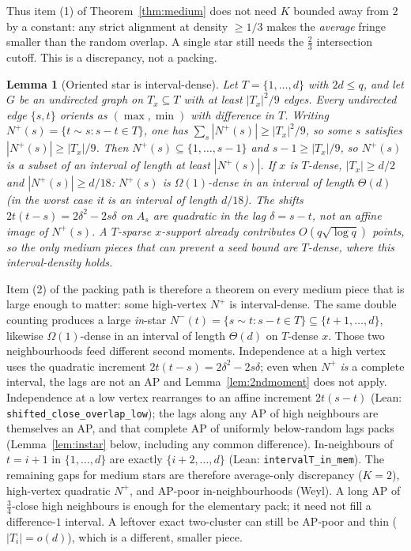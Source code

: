 \documentclass[11pt]{article}
\newtheorem{lemma}[theorem]{Lemma}
\theoremstyle{definition}
\begin{document}
Thus item (1) of Theorem~\ref{thm:medium} does not need $K$ bounded
away from $2$ by a constant: any strict alignment at density $\ge 1/3$
makes the \emph{average} fringe smaller than the random overlap.
A single star still needs the $\tfrac23$ intersection cutoff.
This is a discrepancy, not a packing.

\begin{lemma}[Oriented star is interval-dense]\label{lem:stardense}
Let $T=\{1,\dots,d\}$ with $2d\le q$, and let $G$ be an undirected graph
on $T_x\subseteq T$ with at least $|T_x|^{2}/9$ edges.
Every undirected edge $\{s,t\}$ orients as $(\max,\min)$ with
difference in $T$.
Writing $N^+(s)=\{t\sim s:s-t\in T\}$, one has
$\sum_s|N^+(s)|\ge|T_x|^{2}/9$, so some $s$ satisfies
$|N^+(s)|\ge|T_x|/9$.
Then $N^+(s)\subseteq\{1,\dots,s-1\}$ and $s-1\ge|T_x|/9$, so $N^+(s)$
is a subset of an interval of length at least $|N^+(s)|$.
If $x$ is $T$-dense, $|T_x|\ge d/2$ and $|N^+(s)|\ge d/18$:
$N^+(s)$ is $\Omega(1)$-dense in an interval of length $\Theta(d)$
(in the worst case it \emph{is} an interval of length $d/18$).
The shifts $2t(t-s)=2\delta^{2}-2s\delta$ on $A_s$ are quadratic in
the lag $\delta=s-t$, not an affine image of $N^+(s)$.
A $T$-sparse $x$-support already contributes $O(q\sqrt{\log q})$ points,
so the only medium pieces that can prevent a seed bound are $T$-dense,
where this interval-density holds.
\end{lemma}

Item (2) of the packing path is therefore a theorem on every medium
piece that is large enough to matter: some high-vertex $N^+$ is
interval-dense.
The same double counting produces a large \emph{in}-star
$N^-(t)=\{s\sim t:s-t\in T\}\subseteq\{t+1,\dots,d\}$, likewise
$\Omega(1)$-dense in an interval of length $\Theta(d)$ on $T$-dense $x$.
Those two neighbourhoods feed different second moments.
Independence at a high vertex uses the quadratic increment
$2t(t-s)=2\delta^{2}-2s\delta$; even when $N^+$ \emph{is} a complete
interval, the lags are not an AP and Lemma~\ref{lem:2ndmoment} does
not apply.
Independence at a low vertex rearranges to an affine increment
$2t(s-t)$ (Lean: \texttt{shifted\_close\_overlap\_low}); the lags
along any AP of high neighbours are themselves an AP, and that
complete AP of uniformly below-random lags packs
(Lemma~\ref{lem:instar} below, including any common difference).
In-neighbours of $t=i+1$ in $\{1,\dots,d\}$ are exactly
$\{i+2,\dots,d\}$ (Lean: \texttt{intervalT\_in\_mem}).
The remaining gaps for medium stars are therefore average-only
discrepancy ($K=2$), high-vertex quadratic $N^+$, and
AP-poor in-neighbourhoods (Weyl).
A long AP of $\tfrac34$-close high neighbours is enough for the
elementary pack; it need not fill a difference-$1$ interval.
A leftover exact two-cluster can still be AP-poor and thin
($|T_i|=o(d)$), which is a different, smaller piece.
\end{document}
